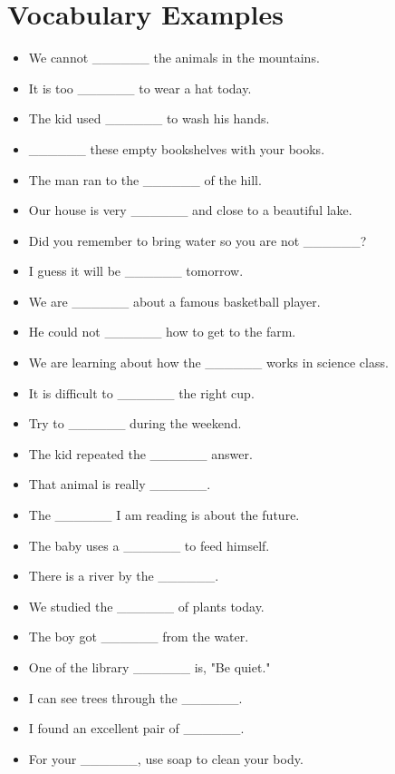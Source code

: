 \documentclass{article}
\begin{document}
\section*{Vocabulary Examples}
\begin{addmargin}[1em]{1em}
\begin{itemize}
    \item We cannot \_\_\_\_\_\_ the animals in the mountains.
    \item It is too \_\_\_\_\_\_ to wear a hat today.
    \item The kid used \_\_\_\_\_\_ to wash his hands.
    \item \_\_\_\_\_\_ these empty bookshelves with your books.
    \item The man ran to the \_\_\_\_\_\_ of the hill.
    \item Our house is very \_\_\_\_\_\_ and close to a beautiful lake.
    \item Did you remember to bring water so you are not \_\_\_\_\_\_?
    \item I guess it will be \_\_\_\_\_\_ tomorrow.
    \item We are \_\_\_\_\_\_ about a famous basketball player.
    \item He could not \_\_\_\_\_\_ how to get to the farm.
    \item We are learning about how the \_\_\_\_\_\_ works in science class.
    \item It is difficult to \_\_\_\_\_\_ the right cup.
    \item Try to \_\_\_\_\_\_ during the weekend.
    \item The kid repeated the \_\_\_\_\_\_ answer.
    \item That animal is really \_\_\_\_\_\_.
    \item The \_\_\_\_\_\_ I am reading is about the future.
    \item The baby uses a \_\_\_\_\_\_ to feed himself.
    \item There is a river by the \_\_\_\_\_\_.
    \item We studied the \_\_\_\_\_\_ of plants today.
    \item The boy got \_\_\_\_\_\_ from the water.
    \item One of the library \_\_\_\_\_\_ is, "Be quiet."
    \item I can see trees through the \_\_\_\_\_\_.
    \item I found an excellent pair of \_\_\_\_\_\_.
    \item For your \_\_\_\_\_\_, use soap to clean your body.

\end{itemize}
\end{addmargin}
\end{document}
